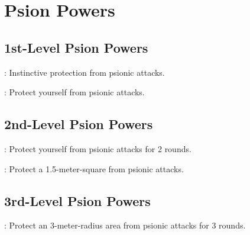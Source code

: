 \section{Psion Powers}



\subsection{1st-Level Psion Powers}

: Instinctive protection from psionic attacks.

: Protect yourself from psionic attacks.



\subsection{2nd-Level Psion Powers}

: Protect yourself from psionic attacks for 2 rounds.

: Protect a 1.5-meter-square from psionic attacks.



\subsection{3rd-Level Psion Powers}

: Protect an 3-meter-radius area from psionic attacks for 3 rounds.
